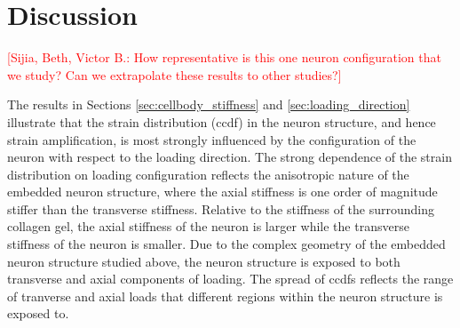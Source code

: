 \documentclass[]{interact}
\newcommand{\red}[1]{\textcolor{red}{[#1]}}
\begin{document}

\section{Discussion}
\label{sec:discussion}

\red{Sijia, Beth, Victor B.: How representative is this one neuron configuration that we study? Can we extrapolate these results to other studies?} 

The results in Sections \ref{sec:cellbody_stiffness} and \ref{sec:loading_direction} illustrate that the strain distribution (ccdf) in the neuron structure, and hence strain amplification, is most strongly influenced by the configuration of the neuron with respect to the loading direction. The strong dependence of the strain distribution on loading configuration reflects the anisotropic nature of the embedded neuron structure, where the axial stiffness is one order of magnitude stiffer than the transverse stiffness. Relative to the stiffness of the surrounding collagen gel, the axial stiffness of the neuron is larger while the transverse stiffness of the neuron is smaller. Due to the complex geometry of the embedded neuron structure studied above, the neuron structure is exposed to both transverse and axial components of loading. The spread of ccdfs reflects the range of tranverse and axial loads that different regions within the neuron structure is exposed to.
\end{document}
